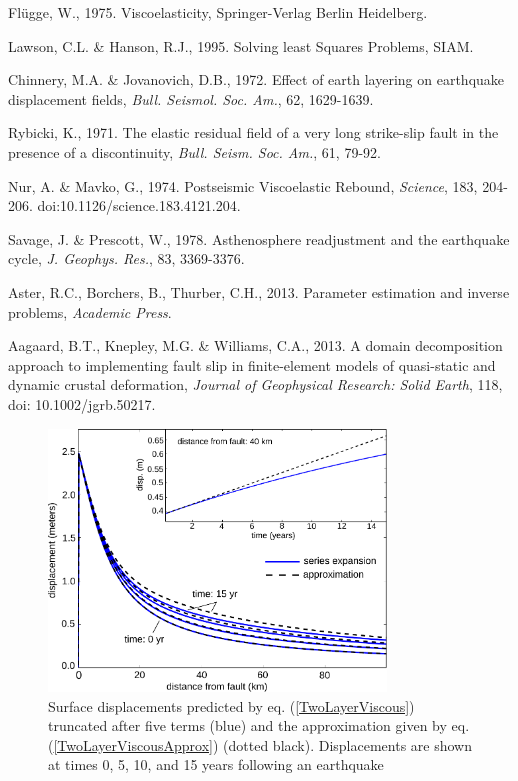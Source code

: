 \documentclass[fleqn,12pt]{article}
\begin{document}
\begin{thebibliography}{}
 Fl\"ugge,
  W., 1975. Viscoelasticity, Springer-Verlag Berlin Heidelberg.

 Lawson, C.L. \&
  Hanson, R.J., 1995. Solving least Squares Problems, SIAM.

 Chinnery,
  M.A. \& Jovanovich, D.B., 1972. Effect of earth layering on
  earthquake displacement fields, \textit{Bull. Seismol.  Soc. Am.},
  62, 1629-1639.

 Rybicki, K., 1971. The elastic
  residual field of a very long strike-slip fault in the presence of a
  discontinuity, \textit{Bull. Seism. Soc. Am.}, 61, 79-92.

 Nur, A. \& Mavko, G.,
  1974. Postseismic Viscoelastic Rebound, \textit{Science}, 183,
  204-206. doi:10.1126/science.183.4121.204.

 Savage, J. \&
  Prescott, W., 1978. Asthenosphere readjustment and the earthquake
  cycle, \textit{J. Geophys. Res.}, 83, 3369-3376.

 Aster, R.C., Borchers,
  B., Thurber, C.H., 2013. Parameter estimation and inverse problems,
  {\textit{Academic Press}}.

 Aagaard, B.T., Knepley,
  M.G. \& Williams, C.A., 2013. A domain decomposition approach to
  implementing fault slip in finite-element models of quasi-static and
  dynamic crustal deformation, \textit{Journal of Geophysical
    Research: Solid Earth}, 118, doi: 10.1002/jgrb.50217.

\end{thebibliography}

\begin{figure}[h!]\label{figure1}
  \centering
  \includegraphics[width=0.8\textwidth]{FinalFigures/Figure1.pdf}
  \caption{Surface displacements predicted by
    eq. (\ref{TwoLayerViscous}) truncated after five terms (blue) and
    the approximation given by eq. (\ref{TwoLayerViscousApprox})
    (dotted black).  Displacements are shown at times 0, 5, 10, and 15
    years following an earthquake}
  \label{figure 1}
\end{figure}
\end{document}
